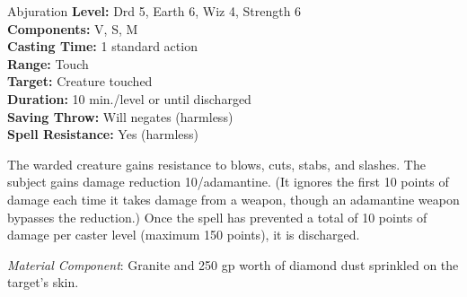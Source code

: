 {Abjuration}
{
	\textbf{Level:}
	Drd 5, Earth 6, Wiz 4, Strength 6\\
	\textbf{Components:}
	V, S, M\\
	\textbf{Casting Time:}
	1 standard action\\
	\textbf{Range:}
	Touch\\
	\textbf{Target:}
	Creature touched\\
	\textbf{Duration:}
	10 min./level or until discharged\\
	\textbf{Saving Throw:}
	Will negates (harmless)\\
	\textbf{Spell Resistance:}
	Yes (harmless)\\
}
{
	The warded creature gains resistance to blows, cuts, stabs, and slashes. The subject gains damage reduction 10/adamantine. (It ignores the first 10 points of damage each time it takes damage from a weapon, though an adamantine weapon bypasses the reduction.) Once the spell has prevented a total of 10 points of damage per caster level (maximum 150 points), it is discharged.

	\textit{Material Component}:
	Granite and 250 gp worth of diamond dust sprinkled on the target's skin.

}
